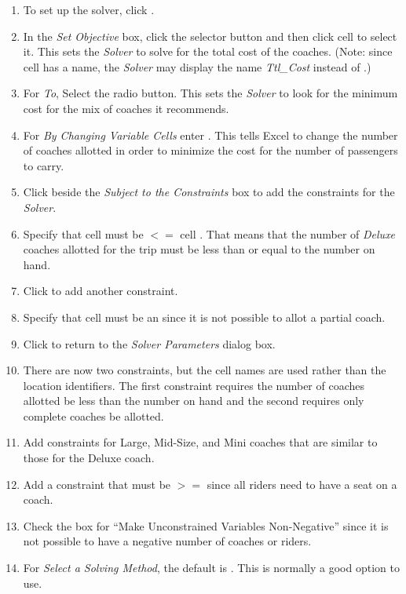 \begin{enumerate}[resume]
	\item To set up the solver, click .
	\item In the \textit{Set Objective} box, click the selector button and then click cell  to select it. This sets the \textit{Solver} to solve for the total cost of the coaches. (Note: since cell  has a name, the \textit{Solver}  may display the name \textit{Ttl\_Cost} instead of .)
	\item For \textit{To}, Select the  radio button. This sets the \textit{Solver} to look for the minimum cost for the mix of coaches it recommends.
	\item For \textit{By Changing Variable Cells} enter . This tells Excel to change the number of coaches allotted in order to minimize the cost for the number of passengers to carry.
	\item Click  beside the \textit{Subject to the Constraints} box to add the constraints for the \textit{Solver}.
	\item Specify that cell  must be $ <= $ cell . That means that the number of \textit{Deluxe} coaches allotted for the trip must be less than or equal to the number on hand.
	\item Click  to add another constraint.
	\item Specify that cell  must be an  since it is not possible to allot a partial coach.
	\item Click  to return to the \textit{Solver Parameters} dialog box. 
	\item There are now two constraints, but the cell names are used rather than the location identifiers. The first constraint requires the number of coaches allotted be less than the number on hand and the second requires only complete coaches be allotted.
	\item Add constraints for Large, Mid-Size, and Mini coaches that are similar to those for the Deluxe coach.
	\item Add a constraint that  must be $ >= $  since all riders need to have a seat on a coach.
	\item Check the box for ``Make Unconstrained Variables Non-Negative'' since it is not possible to have a negative number of coaches or riders.
	 \item For \textit{Select a Solving Method}, the default is . This is normally a good option to use.
	 
\end{enumerate}

